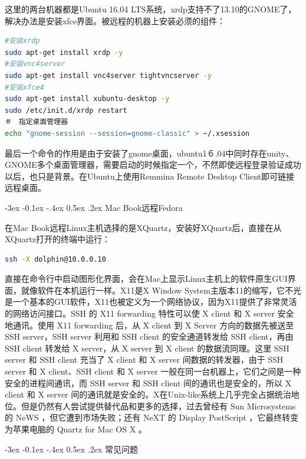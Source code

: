 \documentclass[12pt]{book}
\makeatletter
\numberwithin{dummy}{section}
\theoremstyle{ocrenumbox}
\theoremstyle{blacknumex}
\theoremstyle{blacknumbox}
\theoremstyle{ocrenum}
\renewcommand{\subsection}{\@startsection {subsection}{2}{\z@}
	{-3ex \@plus -0.1ex \@minus -.4ex}
	{0.5ex \@plus.2ex }
	{\normalfont\sffamily\bfseries}}
\makeatother
\begin{document}
这里的两台机器都是Ubuntu 16.04 LTS系统，xrdp支持不了13.10的GNOME了，解决办法是安装xfce界面。被远程的机器上安装必须的组件：

\begin{lstlisting}[language=Bash]
#安装xrdp
sudo apt-get install xrdp -y
#安装vnc4server
sudo apt-get install vnc4server tightvncserver -y
#安装xfce4
sudo apt-get install xubuntu-desktop -y
sudo /etc/init.d/xrdp restart
＃　指定桌面管理器
echo "gnome-session --session=gnome-classic" > ~/.xsession
\end{lstlisting}

最后一个命令的作用是由于安装了gnome桌面，ubuntu1６.04中同时存在unity、GNOME多个桌面管理器，需要启动的时候指定一个，不然即使远程登录验证成功以后，也只是背景。在Ubuntu上使用Remmina Remote Desktop Client即可链接远程桌面。

\subsection{Mac Book远程Fedora}

在Mac Book远程Linux主机选择的是XQuartz，安装好XQuartz后，直接在从XQuartz打开的终端中运行：

\begin{lstlisting}[language=Bash]
ssh -X dolphin@10.0.0.10
\end{lstlisting}

直接在命令行中启动图形化界面，会在Mac上显示Linux主机上的软件原生GUI界面，就像软件在本机运行一样。X11是X Window System主版本11的缩写，它不光是一个基本的GUI软件，X11也被定义为一个网络协议，因为X11提供了非常灵活的网络访问接口。SSH 的 X11 forwarding 特性可以使 X client 和 X server 安全地通讯。使用 X11 forwarding 后，从 X client 到 X Server 方向的数据先被送至 SSH server，SSH server 利用和 SSH client 的安全通道转发给 SSH client，再由 SSH client 转发给 X server，从 X server 到 X client 的数据流同理。这里 SSH server 和 SSH client 充当了 X client 和 X server 间数据的转发器，由于 SSH server 和 X client、SSH client 和 X server 一般在同一台机器上，它们之间是一种安全的进程间通讯，而 SSH server 和 SSH client 间的通讯也是安全的，所以 X client 和 X server 间的通讯就是安全的。X在Unix-like系统上几乎完全占据统治地位。但是仍然有人尝试提供替代品和更多的选择，过去曾经有 Sun Microsystems 的 NeWS ，但它遭到市场失败；还有 NeXT 的 Display PostScript ，它最终转变为苹果电脑的 Quartz for Mac OS X 。

\subsection{常见问题}
\end{document}
